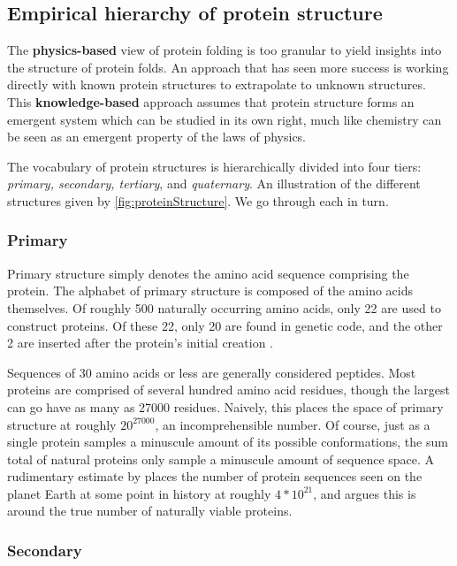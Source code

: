 \documentclass{article}
\begin{document}
\subsection{Empirical hierarchy of protein structure}
The \textbf{physics-based} view of protein folding is too granular to yield insights into the structure of protein folds. An approach that has seen more success is working directly with known protein structures to extrapolate to unknown structures. This \textbf{knowledge-based} approach assumes that protein structure forms an emergent system which can be studied in its own right, much like chemistry can be seen as an emergent property of the laws of physics.

The vocabulary of protein structures is hierarchically divided into four tiers: \textit{primary, secondary, tertiary}, and \textit{quaternary}. An illustration of the different structures given by \autoref{fig:proteinStructure}. We go through each in turn.

\subsubsection{Primary} Primary structure simply denotes the amino acid sequence comprising the protein. The alphabet of primary structure is composed of the amino acids themselves. Of roughly 500 naturally occurring amino acids, only 22 are used to construct proteins. Of these 22, only 20 are found in genetic code, and the other 2 are inserted after the protein's initial creation \cite{20proteins}.

Sequences of 30 amino acids or less are generally considered peptides. Most proteins are comprised of several hundred amino acid residues, though the largest can go have as many as 27000 residues. Naively, this places the space of primary structure at roughly $20^{27000}$, an incomprehensible number. Of course, just as a single protein samples a minuscule amount of its possible conformations, the sum total of natural proteins only sample a minuscule amount of sequence space. A rudimentary estimate by \cite{sequenceExploration} places the number of protein sequences seen on the planet Earth at some point in history at roughly $4 * 10^{21}$, and argues this is around the true number of naturally viable proteins.

\subsubsection{Secondary}
\end{document}

